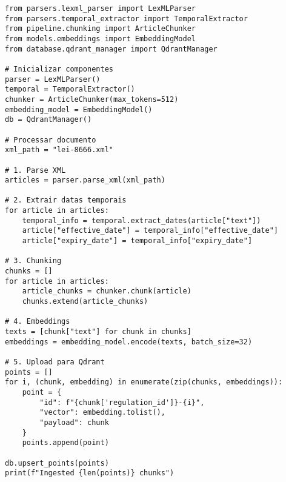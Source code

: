 \documentclass[12pt,a4paper]{article}
\begin{document}
\begin{lstlisting}[caption={Complete Ingestion Pipeline}]
from parsers.lexml_parser import LexMLParser
from parsers.temporal_extractor import TemporalExtractor
from pipeline.chunking import ArticleChunker
from models.embeddings import EmbeddingModel
from database.qdrant_manager import QdrantManager

# Inicializar componentes
parser = LexMLParser()
temporal = TemporalExtractor()
chunker = ArticleChunker(max_tokens=512)
embedding_model = EmbeddingModel()
db = QdrantManager()

# Processar documento
xml_path = "lei-8666.xml"

# 1. Parse XML
articles = parser.parse_xml(xml_path)

# 2. Extrair datas temporais
for article in articles:
    temporal_info = temporal.extract_dates(article["text"])
    article["effective_date"] = temporal_info["effective_date"]
    article["expiry_date"] = temporal_info["expiry_date"]

# 3. Chunking
chunks = []
for article in articles:
    article_chunks = chunker.chunk(article)
    chunks.extend(article_chunks)

# 4. Embeddings
texts = [chunk["text"] for chunk in chunks]
embeddings = embedding_model.encode(texts, batch_size=32)

# 5. Upload para Qdrant
points = []
for i, (chunk, embedding) in enumerate(zip(chunks, embeddings)):
    point = {
        "id": f"{chunk['regulation_id']}-{i}",
        "vector": embedding.tolist(),
        "payload": chunk
    }
    points.append(point)

db.upsert_points(points)
print(f"Ingested {len(points)} chunks")
\end{lstlisting}
\end{document}
